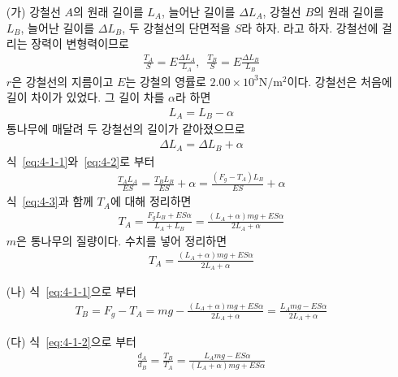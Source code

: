 \documentclass[floatfix,nofootinbib,superscriptaddress,fleqn]{revtex4-2}
\begin{document}
\begin{itemize}
  \item[(가)] 
  강철선 $A$의 원래 길이를 $L_A$, 늘어난 길이를 $\Delta L_A$, 
  강철선 $B$의 원래 길이를 $L_B$, 늘어난 길이를 $\Delta L_B$, 
  두 강철선의 단면적을 $S$라 하자.
  라고 하자. 강철선에 걸리는 장력이 변형력이므로
  \begin{align}  \label{eq:4-2}
    \frac{T_A }{S} = E\frac{\Delta L_A}{L_A},\,\,\,
    \frac{T_B }{S} = E\frac{\Delta L_B}{L_B}
  \end{align}
  $r$은 강철선의 지름이고
  $E$는 강철의 영률로 $2.00\times 10^3\mathrm{N/m^2}$이다.
  강철선은 처음에 길이 차이가 있었다. 그 길이 차를 $\alpha$라 하면
  \begin{align}\label{eq:4-3}
    L_A = L_B - \alpha
  \end{align}  
  통나무에 매달려 두 강철선의 길이가 같아졌으므로 
  \begin{align}
    \Delta L_A= \Delta L_B + \alpha
  \end{align}
  식~\eqref{eq:4-1-1}와~\eqref{eq:4-2}로 부터
  \begin{align}
    \frac{ T_AL_A }{ES } = \frac{T_B L_B }{E S} + \alpha
    =\frac{(F_g-T_A)L_B }{E S} + \alpha
  \end{align}
  식~\eqref{eq:4-3}과 함께 $T_A$에 대해 정리하면
  \begin{align}
    T_A =  \frac{F_gL_B + ES\alpha}{L_A+L_B}
    =\frac{(L_A+\alpha )mg + ES\alpha}{2L_A+\alpha}
  \end{align}
  $m$은 통나무의 질량이다. 수치를 넣어 정리하면
  \begin{align}
    T_A =\frac{(L_A+\alpha )mg + ES\alpha}{2L_A+\alpha}
  \end{align}
  \item[(나)]
  식~\eqref{eq:4-1-1}으로 부터
  \begin{align}
    T_B = F_g - T_A
    =mg - \frac{(L_A+\alpha )mg + ES\alpha}{2L_A+\alpha}
    =\frac{L_A mg-ES\alpha}{2L_A+\alpha}
  \end{align}
  \item[(다)]
  식~\eqref{eq:4-1-2}으로 부터
  \begin{align}
    \frac{d_A}{d_B} = \frac{T_B}{T_A}
    =\frac{L_A mg-ES\alpha}{(L_A+\alpha )mg + ES\alpha}
  \end{align}
\end{itemize}
\end{document}
